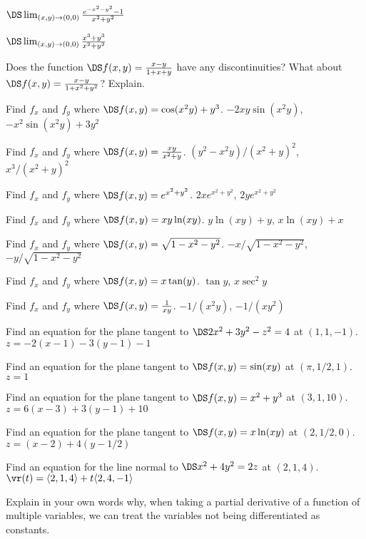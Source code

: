 \begin{multicols}{2}
\problem $\DS\lim_{(x,y)\to(0,0)} {e^{-x^2-y^2}-1\over x^2+y^2}$ %

\problem $\DS\lim_{(x,y)\to(0,0)}{x^3+y^3\over x^2+y^2}$ %

\problem Does the function $\DS f(x,y)={x-y\over 1+x+y}$  %
have any discontinuities?  What about 
$\DS f(x,y)={x-y\over 1+x^2+y^2}$?  Explain.





\problem Find $f_x$ and $f_y$ where $\DS f(x,y)=\cos(x^2y)+y^3$. %
\answer
$-2xy\sin(x^2y)$, $-x^2\sin(x^2y)+3y^2$
\endanswer

\problem Find $f_x$ and $f_y$ where $\DS f(x,y)={xy\over x^2+y}$. %
\answer
$(y^2-x^2y)/(x^2+y)^2$, $x^3/(x^2+y)^2$
\endanswer

\problem Find $f_x$ and $f_y$ where $\DS f(x,y)=e^{x^2+y^2}$. %
\answer
$2xe^{x^2+y^2}$, $2ye^{x^2+y^2}$
\endanswer

\problem Find $f_x$ and $f_y$ where $\DS f(x,y)=xy\ln(xy)$. %
\answer
$y\ln(xy)+y$, $x\ln(xy)+x$
\endanswer

\problem Find $f_x$ and $f_y$ where $\DS f(x,y)=\sqrt{1-x^2-y^2}$. %
\answer
$-x/\sqrt{1-x^2-y^2}$, $-y/\sqrt{1-x^2-y^2}$
\endanswer

\problem Find $f_x$ and $f_y$ where $\DS f(x,y)=x\tan(y)$. %
\answer
$\tan y$, $x\sec^2 y$
\endanswer

\problem Find $f_x$ and $f_y$ where $\DS f(x,y)={1\over xy}$. %
\answer
$-1/(x^2y)$, $-1/(xy^2)$
\endanswer

\problem Find an equation for the plane tangent to  %
$\DS 2x^2+3y^2-z^2=4$ at
$(1,1,-1)$. 
\answer
$z=-2(x-1)-3(y-1)-1$
\endanswer

\problem Find an equation for the plane tangent to  %
$\DS f(x,y)=\sin(xy)$ at
$(\pi,1/2,1)$. 
\answer
$z=1$
\endanswer

\problem Find an equation for the plane tangent to  %
$\DS f(x,y)=x^2+y^3$ at
$(3,1,10)$. 
\answer
$z=6(x-3)+3(y-1)+10$
\endanswer

\problem Find an equation for the plane tangent to  %
$\DS f(x,y)=x\ln(xy)$ at
$(2,1/2,0)$. 
\label{ex:ln tan plane}
\answer
$z=(x-2)+4(y-1/2)$
\endanswer

\problem Find an equation for the line normal to  %
$\DS x^2+4y^2=2z$ at
$(2,1,4)$. 
\answer
$\vr (t)=\langle 2,1,4\rangle+t\langle 2,4,-1\rangle$
\endanswer


\problem Explain in your own words why, when taking a partial derivative %
of a function of multiple variables, we can treat the variables not
being differentiated as constants.


\end{multicols}
